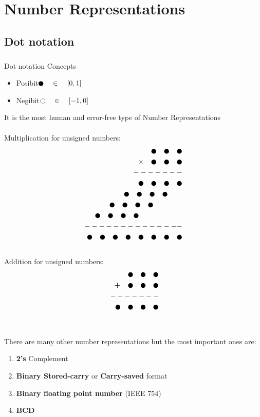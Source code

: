 \chapter{Number Representations}

\section{Dot notation}
\paragraph{}Dot notation Concepts 
\begin{itemize}
	\item Posibit\quad  \(\newmoon\quad\in\quad [0,1]\) 
	\item Negibit\quad	\(\ocircle\quad\in\quad [-1,0]\)
\end{itemize}

It is the most human and error-free type of Number Representations\\
\\
Multiplication for unsigned numbers:
\begin{align*}
	\newmoon\quad\newmoon\quad\newmoon \\
	\mathcal{\times}\quad\newmoon\quad\newmoon\quad\newmoon\\
	\--------\\
	\newmoon\quad\newmoon\quad\newmoon\quad\newmoon\\
	\newmoon\quad\newmoon\quad\newmoon\quad\newmoon\quad\quad\\
	\newmoon\quad\newmoon\quad\newmoon\quad\newmoon\qquad\qquad\\
	\newmoon\quad\newmoon\quad\newmoon\quad\newmoon\qquad\qquad\qquad\\
	\--\----\-----------\\
	\newmoon\quad\newmoon\quad\newmoon\quad\newmoon\quad\newmoon\quad\newmoon\quad\newmoon\quad\newmoon
\end{align*}\\
Addition for unsigned numbers:
\begin{align*}
	\newmoon\quad\newmoon\quad\newmoon \\
	\textbf{+}\quad\newmoon\quad\newmoon\quad\newmoon\\
	\--------\\
	\quad\newmoon\quad\newmoon\quad\newmoon\quad\newmoon
\end{align*}\\
\\
There are many other number representations but the most important ones are:
\begin{enumerate}
	\item \textbf{2's} Complement
	\item \textbf{Binary Stored-carry} or \textbf{Carry-saved} format
	\item \textbf{Binary floating point number } (IEEE 754)
	\item \textbf{BCD}
\end{enumerate}

